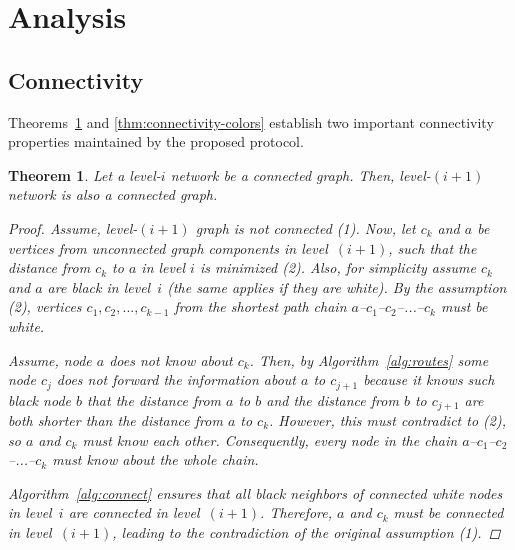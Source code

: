 \documentclass[conference]{IEEEtran}
\newtheorem{thm}{Theorem}
\theoremstyle{definition}
\begin{document}
\section{Analysis}
\label{sec:analysis}

\subsection{Connectivity}

Theorems~\ref{thm:connectivity-levels} and \ref{thm:connectivity-colors} establish 
two important connectivity properties maintained by the proposed protocol.

\begin{thm}
    Let a level-$i$ network be a connected graph. Then, level-$(i+1)$ network is also a connected graph.

    \begin{proof}
        Assume, level-$(i+1)$ graph is not connected (1). Now, let $c_k$ and $a$ be vertices from unconnected graph components in level~$(i+1)$, such that the distance from $c_k$ to $a$ in level $i$ is minimized (2). Also, for simplicity assume $c_k$ and $a$ are black in level~$i$ (the same applies if they are white). By the assumption (2), vertices $c_1,c_2,...,c_{k-1}$ from the shortest path chain $a$--$c_1$--$c_2$--...--$c_k$ must be white.

        Assume, node $a$ does not know about $c_k$. Then, by Algorithm~\ref{alg:routes} some node $c_j$ does not forward the information about $a$ to $c_{j+1}$ because it knows such black node $b$ that the distance from $a$ to $b$ and the distance from $b$ to $c_{j+1}$ are both shorter than the distance from $a$ to $c_k$. However, this must contradict to (2), so $a$ and $c_k$ must know each other. Consequently, every node in the chain $a$--$c_1$--$c_2$--...--$c_k$ must know about the whole chain.

        Algorithm~\ref{alg:connect} ensures that all black neighbors of connected white nodes in level~$i$ are connected in level~$(i+1)$. Therefore, $a$ and $c_k$ must be connected in level~$(i+1)$, leading to the contradiction of the original assumption (1).
    \end{proof}

    \label{thm:connectivity-levels}
\end{thm}
\end{document}
